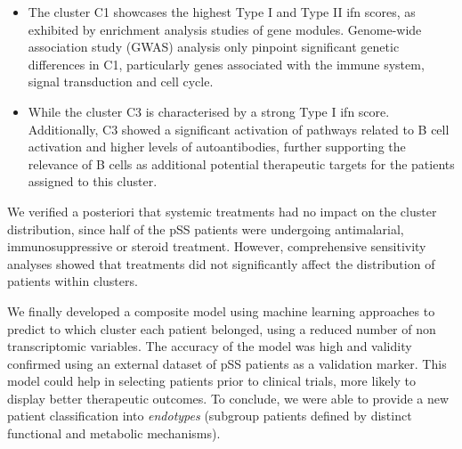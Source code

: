 \documentclass[mainlanguage=english,numlaboratories=2, nofrontcover=true,noaim=false, localbibs, colophon-location=verso-frontcover, oneside, 10pt, localtocs, version=final, nomakeabstract=true]{yathesis}
\begin{document}
{\begin{itemize}
\item The cluster C1 showcases the highest Type I and Type II \acrshort{ifn} scores, as exhibited by enrichment analysis studies of gene modules. Genome-wide association study (GWAS) analysis only pinpoint significant genetic differences in C1, particularly genes associated with the immune system, signal transduction and cell cycle.

\item While the cluster C3 is characterised by a strong Type I \acrshort{ifn} score. Additionally, C3 showed a significant activation of pathways related to B cell activation and higher levels of autoantibodies, further supporting the relevance of B cells as additional potential therapeutic targets for the patients assigned to this cluster.
\end{itemize}

We verified a posteriori that systemic treatments had no impact on the cluster distribution, since half of the pSS patients were undergoing antimalarial, immunosuppressive or steroid treatment. However, comprehensive sensitivity analyses showed that treatments did not significantly affect the distribution of patients within clusters.


We finally developed a composite model using machine learning approaches to predict to which cluster each patient belonged, using a reduced number of non transcriptomic variables. The accuracy of the model was high and validity confirmed using an external dataset of pSS patients as a validation marker. This model could help in selecting patients prior to clinical trials, more likely to display better therapeutic outcomes.
To conclude, we were able to provide a new patient classification into \emph{endotypes} (subgroup patients defined by distinct functional and metabolic mechanisms). 


}
\end{document}
